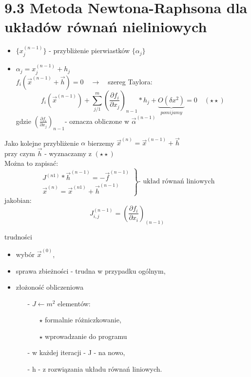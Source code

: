 \section{9.3 Metoda Newtona-Raphsona dla układów równań nieliniowych}

\begin{frame}{}
  \begin{itemize}
    \item $\{x_j^{(n-1)}\}$ - przybliżenie pierwiastków $\{\alpha_j\}$
    \item $\alpha_j=x_j^{(n-1)}+h_j$\\
    $f_i(\overrightarrow{x}^{(n-1)}+\overrightarrow{h})=0\quad\rightarrow\quad$szereg Taylora:
    $$f_i(\overrightarrow{x}^{(n-1)})+\sum_{j/1}^{m}(\frac{\partial f_i}{\partial x_j})_{n-1}*h_j+\underbrace{O(\delta x^2)}_{pomijamy}=0\quad(\star\star)$$
    gdzie $(\frac{\partial f_i}{\partial x_j})_{n-1}$- oznacza obliczone w $\overrightarrow{\alpha}^{(n-1)}$
  \end{itemize}
\end{frame}

\begin{frame}{}
  Jako kolejne przybliżenie $\alpha$ bierzemy $\overrightarrow{x}^{(n)}=\overrightarrow{x}^{(n-1)}+\overrightarrow{h}$\\
  przy czym $\overrightarrow{h}$ - wyznaczamy z $(\star\star)$\\
  Można to zapisać:
 $$
 \left.
 \begin{array}{lr}
 J^{(n1)}*\overrightarrow{h}^{(n-1)} = -\overrightarrow{f}^{(n-1)}\\
 \overrightarrow{x}^{(n)} = \overrightarrow{x}^{(n1)}+\overrightarrow{h}^{(n-1)}
 \end{array}\right\}
 \text{- układ równań liniowych}
 $$
  jakobian:
  $$J^{(n-1)}_{i,j}=(\frac{\partial f_i}{\partial x_i})_{(n-1)}$$
\end{frame}

\begin{frame}{}
  \begin{block}{trudności}
    \begin{itemize}
      \item wybór $\overrightarrow{x}^{(0)}$,
      \item sprawa zbieżności - trudna w przypadku ogólnym,
      \item złożoność obliczeniowa
      \begin{itemize}
        \item[-] $J\leftarrow m^2$ elementów:
        \begin{itemize}
          \item[$\star$] formalnie różniczkowanie,
          \item[$\star$] wprowadzanie do programu
        \end{itemize}
        \item[-] w każdej iteracji - J - na nowo,
        \item[-] h - z rozwiązania układu równań liniowych.
      \end{itemize}
    \end{itemize}
  \end{block}
\end{frame}

